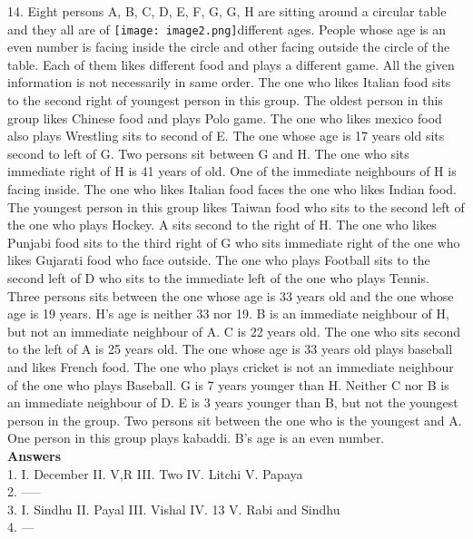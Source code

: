 \documentclass[
]{article}
\begin{document}
14. Eight persons A, B, C, D, E, F, G, G, H are sitting around a circular table and they all are of
 \texttt{[image: image2.png]}different ages. People whose age is an even number is facing inside the circle and other
facing outside the circle of the table. Each of them likes different food and plays a different
game. All the given information is not necessarily in same order. The one who likes Italian
food sits to the second right of youngest person in this group. The oldest person in this
group likes Chinese food and plays Polo game. The one who likes mexico food also plays
Wrestling sits to second of E. The one whose age is 17 years old sits second to left of G. Two
persons sit between G and H. The one who sits immediate right of H is 41 years of old. One
of the immediate neighbours of H is facing inside. The one who likes Italian food faces the
one who likes Indian food. The youngest person in this group likes Taiwan food who sits to
the second left of the one who plays Hockey. A sits second to the right of H. The one who
likes Punjabi food sits to the third right of G who sits immediate right of the one who likes
Gujarati food who face outside. The one who plays Football sits to the second left of D who
sits to the immediate left of the one who plays Tennis. Three persons sits between the one
whose age is 33 years old and the one whose age is 19 years. H's age is neither 33 nor 19. B is
an immediate neighbour of H, but not an immediate neighbour of A. C is 22 years old. The
one who sits second to the left of A is 25 years old. The one whose age is 33 years old plays
baseball and likes French food. The one who plays cricket is not an immediate neighbour of
the one who plays Baseball. G is 7 years younger than H. Neither C nor B is an immediate
neighbour of D. E is 3 years younger than B, but not the youngest person in the group. Two
persons sit between the one who is the youngest and A. One person in this group plays
kabaddi. B's age is an even number.\\

\textbf{Answers}\\
1. I. December II. V,R III. Two IV. Litchi V. Papaya\\

2. -----\\

3. I. Sindhu II. Payal III. Vishal IV. 13 V. Rabi and Sindhu\\

4. ---\\
\end{document}
